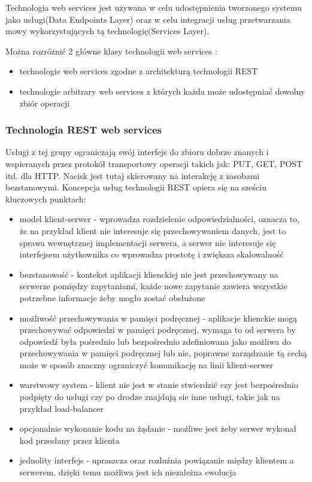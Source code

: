 Technologia web services jest używana w celu udostępnienia tworzonego systemu jako usługi(Data Endpoints Layer) oraz w celu integracji usług przetwarzania mowy wykorzystujących tą technologię(Services Layer).

Można rozróżnić 2 główne klasy technologii web services :
\begin{itemize}
	\item technologie web services zgodne z architekturą technologii REST
	\item technologie arbitrary web services z których każda może udostępniać dowolny zbiór operacji
\end{itemize}  
\subsubsection*{Technologia REST web services}
Usługi z tej grupy \cite{fielding2000} ograniczają swój interfejs do zbioru dobrze znanych i wspieranych przez protokół transportowy operacji takich jak: PUT, GET, POST itd. dla  HTTP. Nacisk jest tutaj skierowany na interakcję z zasobami bezstanowymi. Koncepcja usług technologii REST opiera się na sześciu kluczowych punktach:
\begin{itemize}
	\item model klient-serwer - wprowadza rozdzielenie odpowiedzialności, oznacza to, że na przykład klient nie interesuje się przechowywaniem danych, jest to sprawa wewnętrznej implementacji serwera, a serwer nie interesuje się interfejsem użytkownika co wprowadza prostotę i zwiększa skalowalność
	\item bezstanowość - kontekst aplikacji klienckiej nie jest przechowywany na serwerze pomiędzy zapytaniami, każde nowe zapytanie zawiera wszystkie potrzebne informacje żeby mogło zostać obsłużone
	\item możliwość przechowywania w pamięci podręcznej - aplikacje klienckie mogą przechowywać odpowiedzi w pamięci podręcznej, wymaga to od serwera by odpowiedź była pośrednio lub bezpośrednio zdefiniowana jako możliwa do przechowywania w pamięci podręcznej lub nie, poprawne zarządzanie tą cechą może w sposób znaczny ograniczyć komunikację na linii klient-serwer
	\item warstwowy system - klient nie jest w stanie stwierdzić czy jest bezpośrednio podpięty do usługi czy po drodze znajdują sie inne usługi, takie jak na przykład load-balancer
	\item opcjonalnie wykonanie kodu na żądanie - możliwe jest żeby serwer wykonał kod przesłany przez klienta
	\item jednolity interfejs - upraszcza oraz rozluźnia powiązanie między klientem a serwerem, dzięki temu możliwa jest ich niezależna ewolucja
\end{itemize}   
